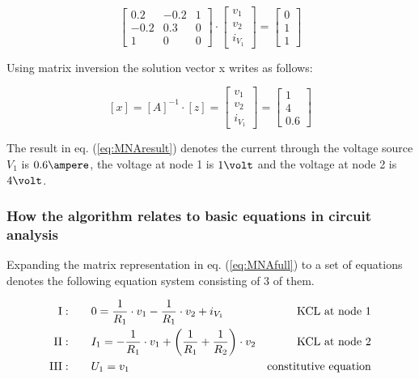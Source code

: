 \begin{equation}
\begin{bmatrix}
0.2 & -0.2 & 1\\
-0.2 & 0.3 & 0\\
1 & 0 & 0
\end{bmatrix}
\cdot
\begin{bmatrix}
v_{1}\\
v_{2}\\
i_{V_{1}}
\end{bmatrix}
=
\begin{bmatrix}
0\\
1\\
1
\end{bmatrix}
\end{equation}

Using matrix inversion the solution vector x writes as follows:

\begin{equation}
\left[x\right] = 
\left[A\right]^{-1}\cdot \left[z\right] = 
\begin{bmatrix}
v_{1}\\
v_{2}\\
i_{V_{1}}
\end{bmatrix}
=
\begin{bmatrix}
1\\
4\\
0.6
\end{bmatrix}
\label{eq:MNAresult}
\end{equation}

The result in eq. (\ref{eq:MNAresult}) denotes the current through the
voltage source $V_{1}$ is $0.6\ampere$, the voltage at node 1 is
$1\volt$ and the voltage at node 2 is $4\volt$.

\subsubsection{How the algorithm relates to basic equations in circuit analysis}

Expanding the matrix representation in eq. (\ref{eq:MNAfull}) to a set
of equations denotes the following equation system consisting of 3 of
them.

\begin{align}
\rm{I:}& \qquad 0 = \frac{1}{R_{1}}\cdot v_{1} - \frac{1}{R_{1}}\cdot v_{2} + i_{V_{1}}& \text{KCL at node 1}\\
\rm{II:}& \qquad I_{1} = -\frac{1}{R_{1}}\cdot v_{1} + \left(\frac{1}{R_{1}} + \frac{1}{R_{2}}\right)\cdot v_{2}& \text{KCL at node 2}\\
\rm{III:}& \qquad U_{1} = v_{1}& \text{constitutive equation}
\end{align}

